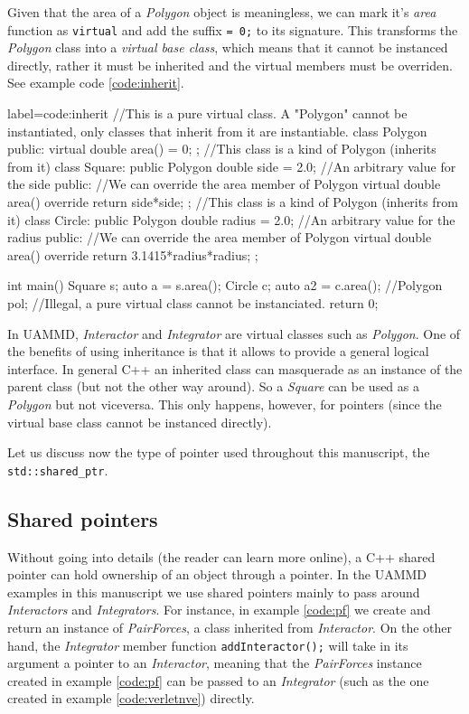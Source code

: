 \documentclass[ twoside,openright,titlepage,numbers=noenddot,%
headinclude,footinclude,cleardoublepage=empty,abstract=on,
BCOR=5mm,paper=b5,fontsize=11pt, dvipsnames
]{scrreprt}
\def\ucpp{uammd_cpp_lexer.py:UAMMDCppLexer -x}
\newcommand{\uammd}{\gls{UAMMD}\xspace}
\begin{document}
Given that the area of a \emph{Polygon} object is meaningless, we can mark it's \emph{area} function as \texttt{virtual} and add the suffix \texttt{= 0;} to its signature. This transforms the \emph{Polygon} class into a \emph{virtual base class}, which means that it cannot be instanced directly, rather it must be inherited and the virtual members must be overriden. See example code \ref{code:inherit}.
\begin{code2} {label=code:inherit}
  //This is a pure virtual class. A "Polygon" cannot be instantiated, only classes that inherit from it are instantiable.
  class Polygon{
    public:
    virtual double area() = 0;
  };
  //This class is a kind of Polygon (inherits from it)
  class Square: public Polygon{
    double side = 2.0; //An arbitrary value for the side
    public:
    //We can override the area member of Polygon
    virtual double area() override{
      return side*side;
    }
  };
  //This class is a kind of Polygon (inherits from it)
  class Circle: public Polygon{
    double radius = 2.0; //An arbitrary value for the radius
    public:
    //We can override the area member of Polygon
    virtual double area() override{
      return 3.1415*radius*radius;
    }
  };

  int main(){
    Square s;
    auto a = s.area();
    Circle c;
    auto a2 = c.area();
    //Polygon pol; //Illegal, a pure virtual class cannot be instanciated.
    return 0;  
  }
\end{code2}

In \uammd, \emph{Interactor} and \emph{Integrator} are virtual classes such as \emph{Polygon}. One of the benefits of using inheritance is that it allows to provide a general logical interface. In general C++ an inherited class can masquerade as an instance of the parent class (but not the other way around). So a \emph{Square} can be used as a \emph{Polygon} but not viceversa. This only happens, however, for pointers (since the virtual base class cannot be instanced directly).

Let us discuss now the type of pointer used throughout this manuscript, the \texttt{std::shared_ptr}.

\subsection*{Shared pointers}
Without going into details (the reader can learn more online), a C++ shared pointer can hold ownership of an object through a pointer. In the \uammd examples in this manuscript we use shared pointers mainly to pass around \emph{Interactors} and \emph{Integrators}. For instance, in example \ref{code:pf} we create and return an instance of \emph{PairForces}, a class inherited from \emph{Interactor}. On the other hand, the \emph{Integrator} member function \texttt{addInteractor();} will take in its argument a pointer to an \emph{Interactor}, meaning that the \emph{PairForces} instance created in example \ref{code:pf} can be passed to an \emph{Integrator} (such as the one created in example \ref{code:verletnve}) directly.
\end{document}
